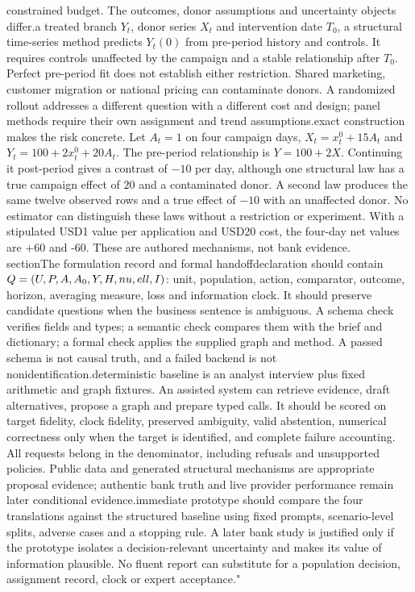 constrained budget. The outcomes, donor assumptions and uncertainty objects differ.\n\nFor a treated branch $Y_t$, donor series $X_t$ and intervention date $T_0$, a structural time-series method predicts $Y_t(0)$ from pre-period history and controls. It requires controls unaffected by the campaign and a stable relationship after $T_0$. Perfect pre-period fit does not establish either restriction. Shared marketing, customer migration or national pricing can contaminate donors. A randomized rollout addresses a different question with a different cost and design; panel methods require their own assignment and trend assumptions.\n\nAn exact construction makes the risk concrete. Let $A_t=1$ on four campaign days, $X_t=x_t^0+15A_t$ and $Y_t=100+2x_t^0+20A_t$. The pre-period relationship is $Y=100+2X$. Continuing it post-period gives a contrast of $-10$ per day, although one structural law has a true campaign effect of $20$ and a contaminated donor. A second law produces the same twelve observed rows and a true effect of $-10$ with an unaffected donor. No estimator can distinguish these laws without a restriction or experiment. With a stipulated USD1 value per application and USD20 cost, the four-day net values are +60 and -60. These are authored mechanisms, not bank evidence.\n\n\\section{The formulation record and formal handoff}\n\nThe declaration should contain $Q=(U,P,A,A_0,Y,H,\\nu,\\ell,I)$: unit, population, action, comparator, outcome, horizon, averaging measure, loss and information clock. It should preserve candidate questions when the business sentence is ambiguous. A schema check verifies fields and types; a semantic check compares them with the brief and dictionary; a formal check applies the supplied graph and method. A passed schema is not causal truth, and a failed backend is not nonidentification.\n\nThe deterministic baseline is an analyst interview plus fixed arithmetic and graph fixtures. An assisted system can retrieve evidence, draft alternatives, propose a graph and prepare typed calls. It should be scored on target fidelity, clock fidelity, preserved ambiguity, valid abstention, numerical correctness only when the target is identified, and complete failure accounting. All requests belong in the denominator, including refusals and unsupported policies. Public data and generated structural mechanisms are appropriate proposal evidence; authentic bank truth and live provider performance remain later conditional evidence.\n\nThe immediate prototype should compare the four translations against the structured baseline using fixed prompts, scenario-level splits, adverse cases and a stopping rule. A later bank study is justified only if the prototype isolates a decision-relevant uncertainty and makes its value of information plausible. No fluent report can substitute for a population decision, assignment record, clock or expert acceptance.\n"

